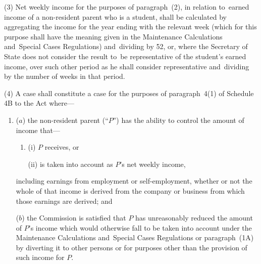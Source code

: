 \documentclass[12pt,a4paper]{article}
\begin{document}
(3) Net weekly income for the purposes of paragraph~(2), in relation to~earned income of a non-resident parent who is a student, shall be calculated by aggregating the income for the year ending with the relevant week (which for this purpose shall have the meaning given in the Maintenance Calculations and~Special Cases Regulations) and~dividing by 52, or, where the Secretary of State does not consider the result to~be representative of the student’s earned income, over such other period as he shall consider representative and~dividing by the number of weeks in that period.

%

(4) A case shall constitute a case for the purposes of paragraph~4(1) of Schedule 4B to the Act where—
\begin{enumerate}\item[]
($a$) the non-resident parent (“$P$”) has the ability to control the amount of income that—
\begin{enumerate}\item[]
(i) $P$ receives, or

(ii) is taken into account as $P$’s net weekly income,
\end{enumerate}
including earnings from employment or self-employment, whether or not the whole of that income is derived from the company or business from which those earnings are derived; and

($b$) the Commission is satisfied that $P$ has unreasonably reduced the amount of $P$’s income which would otherwise fall to be taken into account under the Maintenance Calculations and~Special Cases Regulations or paragraph~(1A) by diverting it to other persons or for purposes other than the provision of such income for $P$.
\end{enumerate}
\end{document}
